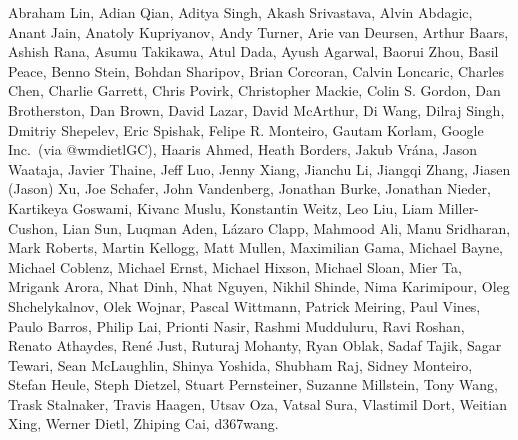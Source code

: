 Abraham Lin,
Adian Qian,
Aditya Singh,
Akash Srivastava,
Alvin Abdagic,
Anant Jain,
Anatoly Kupriyanov,
Andy Turner,
Arie van Deursen,
Arthur Baars,
Ashish Rana,
Asumu Takikawa,
Atul Dada,
Ayush Agarwal,
Baorui Zhou,
Basil Peace,
Benno Stein,
Bohdan Sharipov,
Brian Corcoran,
Calvin Loncaric,
Charles Chen,
Charlie Garrett,
Chris Povirk,
Christopher Mackie,
Colin S. Gordon,
Dan Brotherston,
Dan Brown,
David Lazar,
David McArthur,
Di Wang,
Dilraj Singh,
Dmitriy Shepelev,
Eric Spishak,
Felipe R. Monteiro,
Gautam Korlam,
Google Inc.\ (via @wmdietlGC),
Haaris Ahmed,
Heath Borders,
Jakub Vr\'ana,
Jason Waataja,
Javier Thaine,
Jeff Luo,
Jenny Xiang,
Jianchu Li,
Jiangqi Zhang,
Jiasen (Jason) Xu,
Joe Schafer,
John Vandenberg,
Jonathan Burke,
Jonathan Nieder,
Kartikeya Goswami,
Kivanc Muslu,
Konstantin Weitz,
Leo Liu,
Liam Miller-Cushon,
Lian Sun,
Luqman Aden,
L\'azaro Clapp,
Mahmood Ali,
Manu Sridharan,
Mark Roberts,
Martin Kellogg,
Matt Mullen,
Maximilian Gama,
Michael Bayne,
Michael Coblenz,
Michael Ernst,
Michael Hixson,
Michael Sloan,
Mier Ta,
Mrigank Arora,
Nhat Dinh,
Nhat Nguyen,
Nikhil Shinde,
Nima Karimipour,
Oleg Shchelykalnov,
Olek Wojnar,
Pascal Wittmann,
Patrick Meiring,
Paul Vines,
Paulo Barros,
Philip Lai,
Prionti Nasir,
Rashmi Mudduluru,
Ravi Roshan,
Renato Athaydes,
Ren\'e Just,
Ruturaj Mohanty,
Ryan Oblak,
Sadaf Tajik,
Sagar Tewari,
Sean McLaughlin,
Shinya Yoshida,
Shubham Raj,
Sidney Monteiro,
Stefan Heule,
Steph Dietzel,
Stuart Pernsteiner,
Suzanne Millstein,
Tony Wang,
Trask Stalnaker,
Travis Haagen,
Utsav Oza,
Vatsal Sura,
Vlastimil Dort,
Weitian Xing,
Werner Dietl,
Zhiping Cai,
d367wang.
